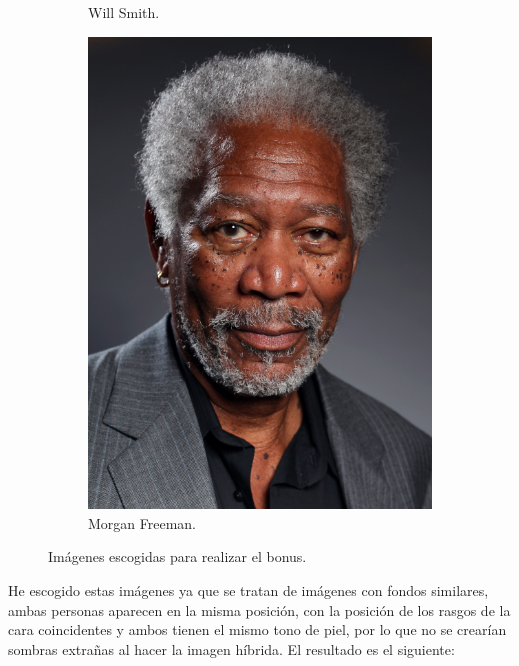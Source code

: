 \documentclass[12pt, spanish]{article}
\begin{document}
\begin{figure}[H]
\begin{subfigure}[t]{0.4\textwidth}
 		 \caption{Will Smith.}
	\end{subfigure}
	\hspace{1cm}
	\begin{subfigure}[t]{0.4\textwidth}
		\centering
      \includegraphics[scale = 1]{hibridas_color/morgan_freeman.png}
 		 \caption{Morgan Freeman.}
	\end{subfigure}
	\caption{Imágenes escogidas para realizar el bonus.}

  	\label{fig:bonus}
\end{figure}

He escogido estas imágenes ya que se tratan de imágenes con fondos similares, ambas personas aparecen en la misma posición, con la posición de los rasgos de la cara coincidentes y ambos tienen el mismo tono de piel, por lo que no se crearían sombras extrañas al hacer la imagen híbrida. El resultado es el siguiente:
\end{document}
